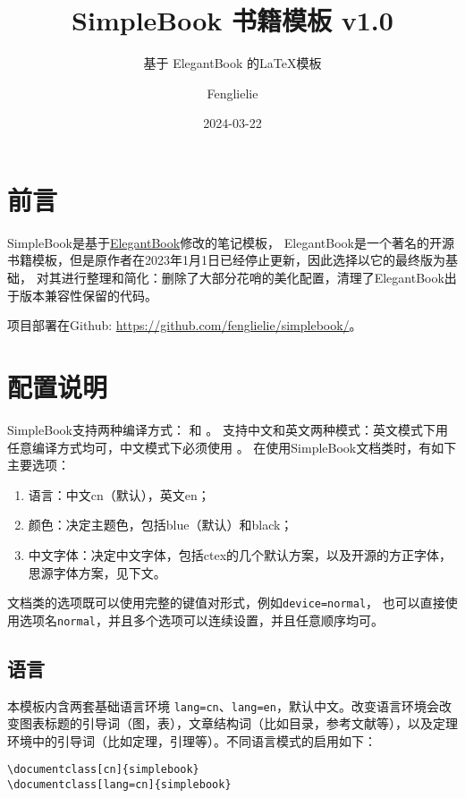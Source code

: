 \documentclass[lang=cn,10pt,cnfont=NotoCJK]{../simplebook}
\title{SimpleBook 书籍模板 v1.0}
\subtitle{基于 ElegantBook 的\LaTeX{}模板}
\author{Fenglielie}
\date{2024-03-22}
\begin{document}
\maketitle

\frontmatter

\chapter*{前言}

SimpleBook是基于\href{https://github.com/ElegantLaTeX/ElegantBook}{ElegantBook}修改的笔记模板，
ElegantBook是一个著名的开源书籍模板，但是原作者在2023年1月1日已经停止更新，因此选择以它的最终版为基础，
对其进行整理和简化：删除了大部分花哨的美化配置，清理了ElegantBook出于版本兼容性保留的代码。

项目部署在Github: \href{https://github.com/fenglielie/simplebook/}{https://github.com/fenglielie/simplebook/}。


\tableofcontents

\mainmatter


\chapter{配置说明}

SimpleBook支持两种编译方式： 和 。
支持中文和英文两种模式：英文模式下用任意编译方式均可，中文模式下必须使用 。
在使用SimpleBook文档类时，有如下主要选项：

\begin{enumerate}
    \item 语言：中文cn（默认），英文en；
    \item 颜色：决定主题色，包括blue（默认）和black；
    \item 中文字体：决定中文字体，包括ctex的几个默认方案，以及开源的方正字体，思源字体方案，见下文。
\end{enumerate}


\begin{remark}
    文档类的选项既可以使用完整的键值对形式，例如\lstinline{device=normal}，
    也可以直接使用选项名\lstinline{normal}，并且多个选项可以连续设置，并且任意顺序均可。
\end{remark}


\section{语言}
本模板内含两套基础语言环境 \lstinline{lang=cn}、\lstinline{lang=en}，默认中文。改变语言环境会改变图表标题的引导词（图，表），文章结构词（比如目录，参考文献等），以及定理环境中的引导词（比如定理，引理等）。不同语言模式的启用如下：
\begin{lstlisting}
\documentclass[cn]{simplebook}
\documentclass[lang=cn]{simplebook}
\end{lstlisting}
\end{document}
